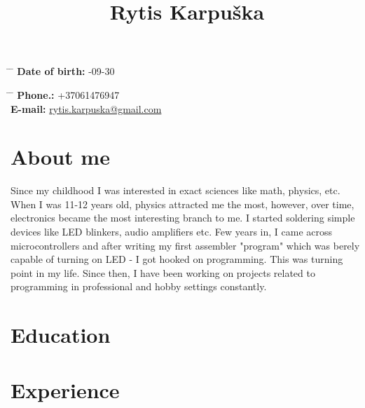 \documentclass[12]{article}
\begin{document}
\title{Rytis Karpuška}


\parbox{0.5\textwidth}{ %
\begin{tabbing} %
\hspace{3cm} \= \hspace{4cm} \= \kill %
{\bf Date of birth:} -09-30\\ %
\end{tabbing}}
\hfill %
\parbox{0.5\textwidth}{ %
\begin{tabbing} %
\hspace{3cm} \= \hspace{4cm} \= \kill %
{\bf Phone.:} \> +37061476947 \\ %
{\bf E-mail:} \> \href{mailto:rytis.karpuska@gmail.com}{rytis.karpuska@gmail.com} \\ %
\end{tabbing}}

\section{About me}

Since my childhood I was interested in exact sciences like math, physics, etc.
When I was 11-12 years old, physics attracted me the most, however, over time, electronics became the most interesting branch to me.
I started soldering simple devices like LED blinkers, audio amplifiers etc.
Few years in, I came across microcontrollers and after writing my first assembler "program" which was berely capable of turning on LED - I got hooked on programming.
This was turning point in my life.
Since then, I have been working on projects related to programming in professional and hobby settings constantly.

\section{Education}


\section{Experience}
\end{document}
